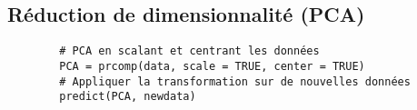 \subsection{Réduction de dimensionnalité (PCA)}
    \begin{lstlisting}
        # PCA en scalant et centrant les données
        PCA = prcomp(data, scale = TRUE, center = TRUE)
        # Appliquer la transformation sur de nouvelles données
        predict(PCA, newdata)
    \end{lstlisting}